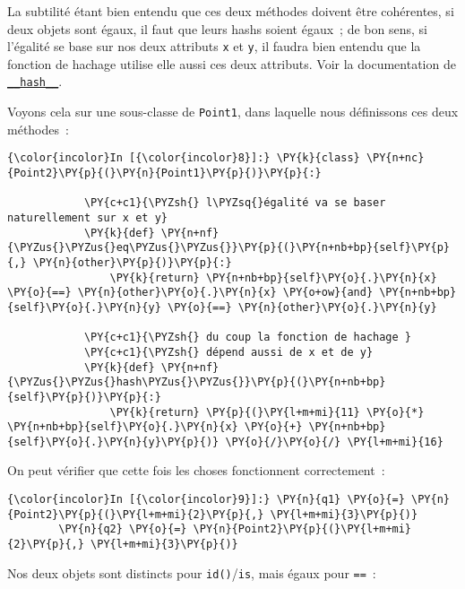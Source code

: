 La subtilité étant bien entendu que ces deux méthodes doivent être
cohérentes, si deux objets sont égaux, il faut que leurs hashs soient
égaux~; de bon sens, si l'égalité se base sur nos deux attributs
\texttt{x} et \texttt{y}, il faudra bien entendu que la fonction de
hachage utilise elle aussi ces deux attributs. Voir la documentation de
\href{https://docs.python.org/3/reference/datamodel.html?highlight=__hash__\#object.__hash__}{\texttt{\_\_hash\_\_}}.

    Voyons cela sur une sous-classe de \texttt{Point1}, dans laquelle nous
définissons ces deux méthodes~:

    \begin{Verbatim}[commandchars=\\\{\}]
{\color{incolor}In [{\color{incolor}8}]:} \PY{k}{class} \PY{n+nc}{Point2}\PY{p}{(}\PY{n}{Point1}\PY{p}{)}\PY{p}{:}
        
            \PY{c+c1}{\PYZsh{} l\PYZsq{}égalité va se baser naturellement sur x et y}
            \PY{k}{def} \PY{n+nf}{\PYZus{}\PYZus{}eq\PYZus{}\PYZus{}}\PY{p}{(}\PY{n+nb+bp}{self}\PY{p}{,} \PY{n}{other}\PY{p}{)}\PY{p}{:}
                \PY{k}{return} \PY{n+nb+bp}{self}\PY{o}{.}\PY{n}{x} \PY{o}{==} \PY{n}{other}\PY{o}{.}\PY{n}{x} \PY{o+ow}{and} \PY{n+nb+bp}{self}\PY{o}{.}\PY{n}{y} \PY{o}{==} \PY{n}{other}\PY{o}{.}\PY{n}{y}
        
            \PY{c+c1}{\PYZsh{} du coup la fonction de hachage }
            \PY{c+c1}{\PYZsh{} dépend aussi de x et de y}
            \PY{k}{def} \PY{n+nf}{\PYZus{}\PYZus{}hash\PYZus{}\PYZus{}}\PY{p}{(}\PY{n+nb+bp}{self}\PY{p}{)}\PY{p}{:}
                \PY{k}{return} \PY{p}{(}\PY{l+m+mi}{11} \PY{o}{*} \PY{n+nb+bp}{self}\PY{o}{.}\PY{n}{x} \PY{o}{+} \PY{n+nb+bp}{self}\PY{o}{.}\PY{n}{y}\PY{p}{)} \PY{o}{/}\PY{o}{/} \PY{l+m+mi}{16}
\end{Verbatim}


    On peut vérifier que cette fois les choses fonctionnent correctement~:

    \begin{Verbatim}[commandchars=\\\{\}]
{\color{incolor}In [{\color{incolor}9}]:} \PY{n}{q1} \PY{o}{=} \PY{n}{Point2}\PY{p}{(}\PY{l+m+mi}{2}\PY{p}{,} \PY{l+m+mi}{3}\PY{p}{)}
        \PY{n}{q2} \PY{o}{=} \PY{n}{Point2}\PY{p}{(}\PY{l+m+mi}{2}\PY{p}{,} \PY{l+m+mi}{3}\PY{p}{)}
\end{Verbatim}


    Nos deux objets sont distincts pour \texttt{id()}/\texttt{is}, mais
égaux pour \texttt{==}~:

